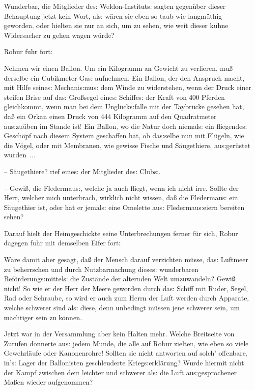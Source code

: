 \documentclass[oneside,12pt]{book}
\newcommand{\s}{s:}
\begin{document}
Wunderbar, die Mitglieder de{\s} Weldon-Institut{\s} sagten
gegen\"uber dieser Behauptung jetzt kein Wort, al{\s} w\"aren sie
eben so taub wie langm\"uthig geworden, oder hielten sie nur an sich,
um zu sehen, wie weit dieser k\"uhne Widersacher zu gehen wagen
w\"urde?

Robur fuhr fort:

{\glqq}Nehmen wir einen Ballon. Um ein Kilogramm an Gewicht zu
verlieren, mu{\ss} derselbe ein Cubikmeter Ga{\s} aufnehmen. Ein
Ballon, der den Anspruch macht, mit Hilfe seine{\s} Mechani{\s}mu{\s}
dem Winde zu widerstehen, wenn der Druck einer steifen Brise auf
da{\s} Gro{\ss}segel eine{\s} Schiffe{\s} der Kraft von 400 Pferden
gleichkommt, wenn man bei dem Ungl\"uck{\s}falle mit der Taybr\"ucke
gesehen hat, da{\ss} ein Orkan einen Druck von 444 Kilogramm auf den
Quadratmeter au{\s}zu\"uben im Stande ist! Ein Ballon, wo die Natur
doch niemal{\s} ein fliegende{\s} Gesch\"opf nach diesem System
geschaffen hat, ob da{\s}selbe nun mit Fl\"ugeln, wie die V\"ogel,
oder mit Membranen, wie gewisse Fische und S\"augethiere,
au{\s}ger\"ustet wurden~...

-- S\"augethiere? rief eine{\s} der Mitglieder de{\s} Club{\s}.

-- Gewi{\ss}, die Fledermau{\s}, welche ja auch fliegt, wenn ich
nicht irre. Sollte der Herr, welcher mich unterbrach, wirklich nicht
wissen, da{\ss} die Fledermau{\s} ein S\"augethier ist, oder hat er
jemal{\s} eine Omelette au{\s} Fledermau{\s}eiern bereiten
sehen?{\grqq}

Darauf hielt der Heimgeschickte seine Unterbrechungen ferner f\"ur
sich, Robur dagegen fuhr mit demselben Eifer fort:

{\glqq}W\"are damit aber gesagt, da{\ss} der Mensch darauf verzichten
m\"usse, da{\s} Luftmeer zu beherrschen und durch Nutzbarmachung
diese{\s} wunderbaren Bef\"orderung{\s}mittel{\s} die Zust\"ande der
alternden Welt umzuwandeln? Gewi{\ss} nicht! So wie er der Herr der
Meere geworden durch da{\s} Schiff mit Ruder, Segel, Rad oder
Schraube, so wird er auch zum Herrn der Luft werden durch Apparate,
welche schwerer sind al{\s} diese, denn unbedingt m\"ussen jene
schwerer sein, um m\"achtiger sein zu k\"onnen.{\grqq}

Jetzt war in der Versammlung aber kein Halten mehr. Welche Breitseite
von Zurufen donnerte au{\s} jedem Munde, die alle auf Robur zielten,
wie eben so viele Gewehrl\"aufe oder Kanonenrohre! Sollten sie nicht
antworten auf solch' offenbare, in'{\s} Lager der Ballonisten
geschleuderte Krieg{\s}erkl\"arung? Wurde hiermit nicht der Kampf
zwischen dem {\glqq}leichter{\grqq} und {\glqq}schwerer al{\s} die
Luft{\grqq} au{\s}gesprochener Ma{\ss}en wieder aufgenommen?
\end{document}
